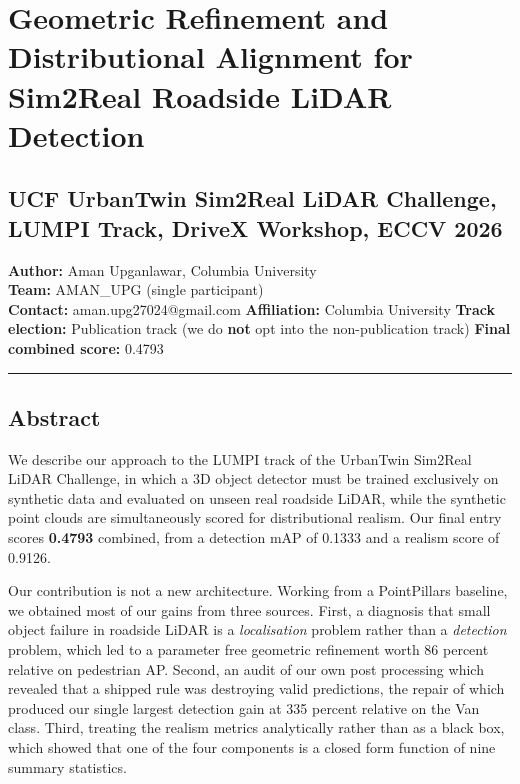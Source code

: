 \documentclass[
  10pt,
]{article}
\author{}
\date{}
\begin{document}
\section{Geometric Refinement and Distributional Alignment for Sim2Real
Roadside LiDAR
Detection}\label{geometric-refinement-and-distributional-alignment-for-sim2real-roadside-lidar-detection}

\subsection{UCF UrbanTwin Sim2Real LiDAR Challenge, LUMPI Track, DriveX
Workshop, ECCV
2026}\label{ucf-urbantwin-sim2real-lidar-challenge-lumpi-track-drivex-workshop-eccv-2026}

\textbf{Author:} Aman Upganlawar, Columbia University\\
\textbf{Team:} AMAN\_UPG (single participant)\\
\textbf{Contact:} aman.upg27024@gmail.com \textbf{Affiliation:} Columbia
University \textbf{Track election:} Publication track (we do
\textbf{not} opt into the non-publication track) \textbf{Final combined
score:} 0.4793

\begin{center}\rule{0.5\linewidth}{0.5pt}\end{center}

\subsection{Abstract}\label{abstract}

We describe our approach to the LUMPI track of the UrbanTwin Sim2Real
LiDAR Challenge, in which a 3D object detector must be trained
exclusively on synthetic data and evaluated on unseen real roadside
LiDAR, while the synthetic point clouds are simultaneously scored for
distributional realism. Our final entry scores \textbf{0.4793} combined,
from a detection mAP of 0.1333 and a realism score of 0.9126.

Our contribution is not a new architecture. Working from a PointPillars
baseline, we obtained most of our gains from three sources. First, a
diagnosis that small object failure in roadside LiDAR is a
\emph{localisation} problem rather than a \emph{detection} problem,
which led to a parameter free geometric refinement worth 86 percent
relative on pedestrian AP. Second, an audit of our own post processing
which revealed that a shipped rule was destroying valid predictions, the
repair of which produced our single largest detection gain at 335
percent relative on the Van class. Third, treating the realism metrics
analytically rather than as a black box, which showed that one of the
four components is a closed form function of nine summary statistics.
\end{document}

